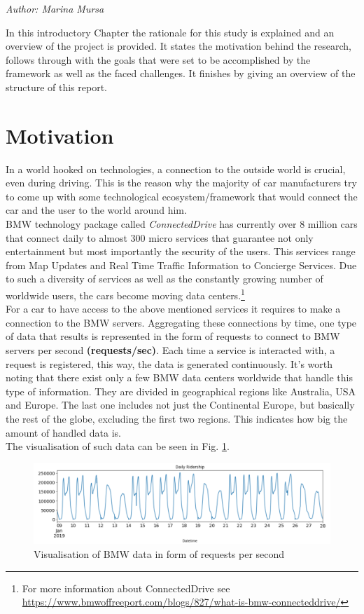 \label{sec:introduction}
\textit{Author: Marina Mursa}

In this introductory Chapter the rationale for this study is explained and an overview of the project is provided.  It states the motivation behind the research, follows through with the goals that were set to be accomplished by the framework as well as the faced challenges. It finishes by giving an overview of the structure of this report.

\section{Motivation}
In a world hooked on technologies, a connection to the outside world is crucial, even during driving. This is the reason why the majority of car manufacturers try to come up with some technological ecosystem/framework that would connect the car and the user to the world around him.\\
BMW technology package called \emph{ConnectedDrive} has currently over 8 million cars that connect daily to almost 300 micro services that guarantee not only entertainment but most importantly the security of the users. This services range from Map Updates and Real Time Traffic Information to Concierge Services. Due to such a diversity of services as well as the constantly growing number of worldwide users, the cars become moving data centers.\footnote{For more information about ConnectedDrive  see \url{https://www.bmwoffreeport.com/blogs/827/what-is-bmw-connecteddrive/}}\\
For a car to have access to the above mentioned services it requires to make a connection to the BMW servers. Aggregating these connections by time, one type of data that results is represented in the form of requests to connect to BMW servers per second \textbf{(requests/sec)}. Each time a service is interacted with, a request is registered, this way, the data is generated continuously. It's worth noting that there exist only a few BMW data centers worldwide that handle this type of information. They are divided in geographical regions like Australia, USA and Europe. The last one includes not just the Continental Europe, but basically the rest of the globe, excluding the first two regions. This indicates how big the amount of handled data is.\\
The visualisation of such data can be seen in Fig. \ref{fig:data_graph}.
\begin{figure}[h]
    \centering
    \includegraphics[width=1\textwidth]{images/data_graph.png}
    \caption{Visualisation of BMW data in form of requests per second }
    \label{fig:data_graph}
\end{figure}
